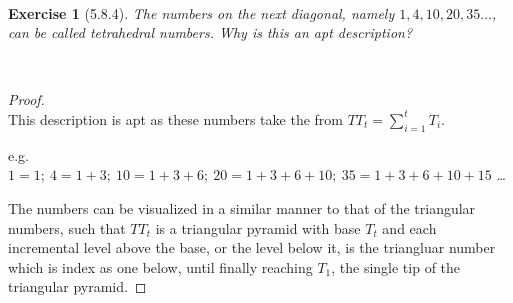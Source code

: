 \documentclass[12pt]{article}
\newcommand{\XB}{\color{black}}
\newcommand{\XBB}{\color{blue}}
\newcommand{\ds}{\displaystyle}
\theoremstyle{plain}
\newtheorem{ex}{Exercise}
\begin{document}
\newpage


\XBB\hrulefill\XB \\
\begin{ex} [5.8.4]
  The numbers on the next diagonal, namely $ 1, 4, 10, 20, 35 \ldots $, can be called \emph{tetrahedral numbers}. Why is this an apt description?
\end{ex}
\XBB\hrulefill\XB \\

\begin{proof}
  \ \\

  This description is apt as these numbers take the from $ \ds TT_{t} = \sum_{i = 1}^{t} T_{i} $.

  e.g. $ 1 = 1; \ 4 = 1 + 3; \ 10 = 1 + 3 + 6; \ 20 = 1 + 3 + 6 + 10; \ 35 = 1 + 3 + 6 + 10 + 15 $ \dots

  The numbers can be visualized in a similar manner to that of the triangular numbers,
  such that $ TT_{t} $ is a triangular pyramid with base $ T_{t} $ and each incremental level above the base,
  or the level below it, is the triangluar number which is index as one below, until finally reaching $ T_{1} $,
  the single tip of the triangular pyramid.

\end{proof}

\newpage
\end{document}
